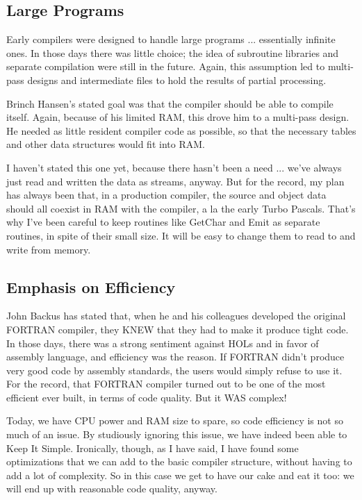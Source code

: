 \subsection{Large Programs}

Early compilers were designed to handle  large  programs ... essentially infinite ones. In those days there was little choice;  the  idea  of  subroutine  libraries  and  separate compilation  were  still  in  the  future. Again, this assumption led to  multi-pass designs and intermediate files to hold the results of partial processing.

Brinch Hansen's  stated goal was that the compiler should be able to compile itself. Again, because of his limited RAM, this drove him to a multi-pass design. He needed  as little resident compiler code as possible, so  that  the necessary tables and other data structures would fit into RAM.

I haven't stated this one yet, because there  hasn't  been a need  ... we've always just read and  written  the  data  as streams, anyway. But  for  the  record, my plan has always been that, in  a  production compiler, the source and object data should all coexist  in  RAM with the compiler, a la the early Turbo Pascals. That's why I've been  careful  to keep routines like GetChar  and  Emit  as  separate  routines, in spite of their small size. It  will be easy to change them to read to and write from memory.

\subsection{Emphasis on Efficiency}

John  Backus has stated that, when  he  and  his  colleagues developed the original FORTRAN compiler, they KNEW that they had to make it produce tight code. In those days, there was a strong sentiment against HOLs  and  in  favor  of assembly language, and  efficiency was the reason. If FORTRAN didn't produce very good  code  by  assembly  standards, the users would simply refuse to use it. For the record, that FORTRAN compiler turned out to  be  one  of  the most efficient ever built, in terms of code quality. But it WAS complex!

Today, we have CPU power and RAM size  to  spare, so  code efficiency is not  so  much  of  an  issue. By studiously ignoring this issue, we  have  indeed  been  able to Keep It Simple. Ironically, though, as I have said, I have found some optimizations that we can  add  to  the  basic compiler structure, without having to add a lot of complexity. So in this  case we get to have our cake and eat it too:  we  will end up with reasonable code quality, anyway.

